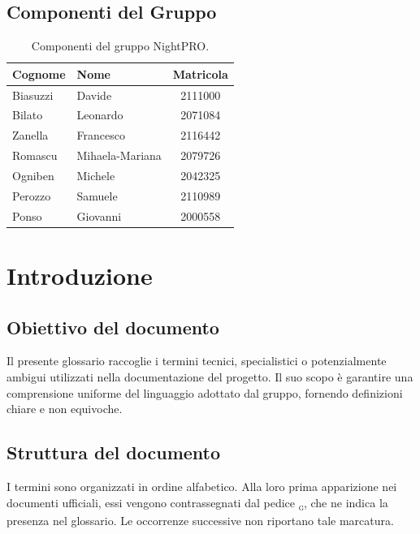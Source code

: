 \documentclass[a4paper, 11pt, oneside]{scrartcl} %
\begin{document}
\subsection{Componenti del Gruppo}

\begin{table}[h!]
    \centering
    \renewcommand{\arraystretch}{1.2} %
    \begin{tabular}{@{}llc@{}}
        \toprule
        \textbf{Cognome} & \textbf{Nome}   & \textbf{Matricola} \\
        \midrule
        Biasuzzi         & Davide          & 2111000            \\
        Bilato           & Leonardo        & 2071084            \\
        Zanella          & Francesco       & 2116442            \\
        Romascu          & Mihaela-Mariana & 2079726            \\
        Ogniben          & Michele         & 2042325            \\
        Perozzo          & Samuele         & 2110989            \\
        Ponso            & Giovanni        & 2000558            \\
        \bottomrule
    \end{tabular}
    \caption{Componenti del gruppo NightPRO.}
\end{table}



\section{Introduzione}

\subsection{Obiettivo del documento}
Il presente glossario raccoglie i termini tecnici, specialistici o potenzialmente ambigui utilizzati nella documentazione del progetto.
Il suo scopo è garantire una comprensione uniforme del linguaggio adottato dal gruppo, fornendo definizioni chiare e non equivoche.
\subsection{Struttura del documento}
I termini sono organizzati in ordine alfabetico.
Alla loro prima apparizione nei documenti ufficiali, essi vengono contrassegnati dal pedice \textsubscript{\textsc{g}}, che ne indica la presenza nel glossario.
Le occorrenze successive non riportano tale marcatura.
\end{document}
